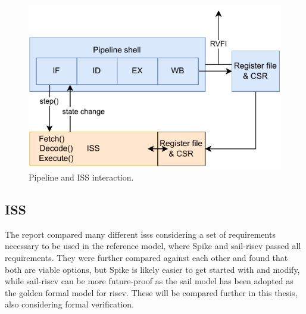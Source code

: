 \begin{figure}[htb]
    \centering
    \includegraphics[width=0.5\linewidth]{figures/pipeline-iss-3.pdf}
    \caption{Pipeline and ISS interaction.}
    \label{fig:pipeline-iss-3}
\end{figure}

\subsection{ISS}

The report compared many different \acrshort{iss}s considering a set of requirements necessary to be used in the reference model, where Spike \cite{SpikeRISCVISA2023} and sail-riscv \cite{RISCVSailModel2023} passed all requirements. They were further compared against each other and found that both are viable options, but Spike is likely easier to get started with and modify, while sail-riscv can be more future-proof as the sail model has been adopted as the golden formal model for \acrshort{riscv}. These will be compared further in this thesis, also considering formal verification.




